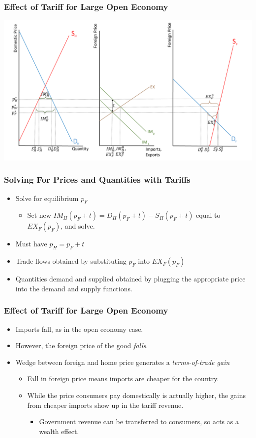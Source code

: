 \documentclass{beamer}
\begin{document}
\begin{frame}
	\frametitle{Effect of Tariff for Large Open Economy}
	\includegraphics[scale=0.3]{SL_11.pdf}
\end{frame}

\begin{frame}
	\frametitle{Solving For Prices and Quantities with Tariffs}
	
	\begin{itemize}
		\item Solve for equilibrium $p_F$
			\begin{itemize}
				\item Set new $IM_H(p_F+t)=D_H(p_F+t) - S_H(p_F+t) $ equal to $EX_F(p_F)$, and solve.
			\end{itemize}
		\item Must have $p_H = p_F + t$
		\item Trade flows obtained by substituting $p_F$ into $EX_F(p_F)$
		\item Quantities demand and supplied obtained by plugging the appropriate price into the demand and supply functions.
	\end{itemize}

\end{frame}

\begin{frame}
	\frametitle{Effect of Tariff for Large Open Economy}
	\begin{itemize}
		\item Imports fall, as in the open economy case.
		\item However, the foreign price of the good \emph{falls}.
		\item Wedge between foreign and home price generates a \emph{terms-of-trade gain} 
			\begin{itemize}
				\item Fall in foreign price means imports are cheaper for the country.
				\item While the price consumers pay domestically is actually higher, the gains from cheaper imports show up in the tariff revenue.
					\begin{itemize}
						\item Government revenue can be transferred to consumers, so acts as a wealth effect.
					\end{itemize}
			\end{itemize}
	\end{itemize}
\end{frame}
\end{document}
